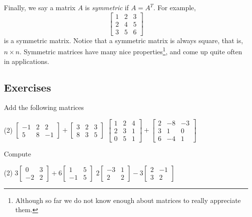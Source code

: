 Finally, we say a matrix $A$ is \emph{symmetric}
if $A = A^T$.  For example,
\begin{equation*}
\begin{bmatrix}
1 & 2 & 3 \\
2 & 4 & 5 \\
3 & 5 & 6
\end{bmatrix}
\end{equation*}
is a symmetric matrix.  Notice that a symmetric matrix is always
square, that is, $n \times n$.  Symmetric matrices 
have many nice properties\footnote{Although so far we do not know enough
about matrices to really appreciate them.},
and come up quite often in applications.

\subsection{Exercises}

\begin{exercise}
Add the following matrices
\begin{tasks}(2)
\task
$\begin{bmatrix}
-1 & 2 & 2 \\
5 & 8 & -1
\end{bmatrix}
+
\begin{bmatrix}
3 & 2 & 3 \\
8 & 3 & 5
\end{bmatrix}$
\task
$\begin{bmatrix}
1 & 2 & 4 \\
2 & 3 & 1 \\
0 & 5 & 1
\end{bmatrix}
+
\begin{bmatrix}
2 & -8 & -3 \\
3 & 1 & 0 \\
6 & -4 & 1
\end{bmatrix}$
\end{tasks}
\end{exercise}

\begin{exercise}
Compute
\begin{tasks}(2)
\task
$3\begin{bmatrix}
0 & 3 \\
-2 & 2
\end{bmatrix}
+
6
\begin{bmatrix}
1 & 5 \\
-1 & 5
\end{bmatrix}$
\task
$2\begin{bmatrix}
-3 & 1 \\
2 & 2
\end{bmatrix}
-
3
\begin{bmatrix}
2 & -1 \\
3 & 2
\end{bmatrix}$
\end{tasks}
\end{exercise}

